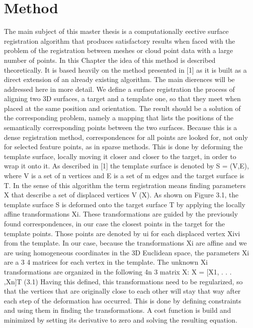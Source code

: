\documentclass[../structure.tex]{subfiles}
\begin{document}
\chapter{Method}
The main subject of this master thesis is a computationally eective surface
registration algorithm that produces satisfactory results when faced with
the problem of the registration between meshes or cloud point data with a
large number of points. In this Chapter the idea of this method is described
theoretically. It is based heavily on the method presented in [1] as it is built
as a direct extension of an already existing algorithm. The main dierences
will be addressed here in more detail.
We define a surface registration the process of aligning two 3D surfaces,
a target and a template one, so that they meet when placed at the same
position and orientation. The result should be a solution of the corresponding
problem, namely a mapping that lists the positions of the semantically
corresponding points between the two surfaces. Because this is a dense registration
method, correspondences for all points are looked for, not only for
selected feature points, as in sparse methods. This is done by deforming the
template surface, locally moving it closer and closer to the target, in order
to wrap it onto it.
As described in [1] the template surface is denoted by S = (V,E), where
V is a set of n vertices and E is a set of m edges and the target surface is T.
In the sense of this algorithm the term registration means finding parameters
X that describe a set of displaced vertices V (X). As shown on Figure 3.1,
the template surface S is deformed onto the target surface T by applying the
locally affine transformations Xi. These transformations are guided by the
previously found correspondences, in our case the closest points in the target
for the template points. Those points are denoted by ui for each displaced
vertex Xivi from the template.
In our case, because the transformations Xi are affine and we are using
homogeneous coordinates in the 3D Euclidean space, the parameters Xi are
a 3 4 matrices for each vertex in the template. The unknown Xi transformations
are organized in the following 4n 3 matrix X:
X = [X1, . . . ,Xn]T (3.1)
Having this defined, this transformations need to be regularized, so that
the vertices that are originally close to each other will stay that way after each
step of the deformation has occurred. This is done by defining constraints
and using them in finding the transformations. A cost function is build and
minimized by setting its derivative to zero and solving the resulting equation.
\end{document}

